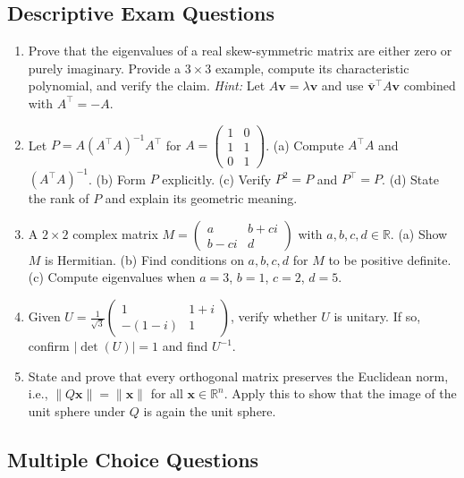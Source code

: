 \documentclass[12pt,a4paper]{article}
\begin{document}
\subsection*{Descriptive Exam Questions}

\begin{enumerate}[label=\textbf{D\arabic*.}]
  \item Prove that the eigenvalues of a real skew-symmetric matrix are either zero or purely imaginary.
    Provide a $3 \times 3$ example, compute its characteristic polynomial, and verify the claim.
    \textit{Hint:} Let $A\mathbf{v} = \lambda\mathbf{v}$ and use $\bar{\mathbf{v}}^\top A\mathbf{v}$ combined with $A^\top = -A$.
  \item Let $P = A(A^\top A)^{-1}A^\top$ for $A = \begin{pmatrix}1&0\\1&1\\0&1\end{pmatrix}$.
    (a) Compute $A^\top A$ and $(A^\top A)^{-1}$.
    (b) Form $P$ explicitly.
    (c) Verify $P^2 = P$ and $P^\top = P$.
    (d) State the rank of $P$ and explain its geometric meaning.
  \item A $2\times 2$ complex matrix $M = \begin{pmatrix}a & b+ci \\ b-ci & d\end{pmatrix}$ with $a, b, c, d \in \mathbb{R}$.
    (a) Show $M$ is Hermitian.
    (b) Find conditions on $a, b, c, d$ for $M$ to be positive definite.
    (c) Compute eigenvalues when $a = 3$, $b = 1$, $c = 2$, $d = 5$.
  \item Given $U = \tfrac{1}{\sqrt{3}}\begin{pmatrix}1&1+i\\-(1-i)&1\end{pmatrix}$,
    verify whether $U$ is unitary. If so, confirm $|\det(U)| = 1$ and find $U^{-1}$.
  \item State and prove that every orthogonal matrix preserves the Euclidean norm, i.e., $\|Q\mathbf{x}\| = \|\mathbf{x}\|$ for all $\mathbf{x} \in \mathbb{R}^n$.
    Apply this to show that the image of the unit sphere under $Q$ is again the unit sphere.
\end{enumerate}

\subsection*{Multiple Choice Questions}
\end{document}
